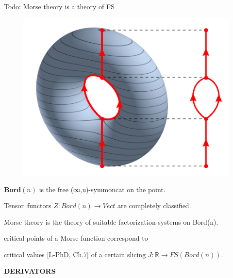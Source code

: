 \documentclass[handout]{beamer}
\begin{document}
\begin{frame}{Todo: Morse theory is a theory of FS}
  \begin{figure}
\includegraphics[scale=.15]{3D-Leveltorus-Reebgraph.png}
  \end{figure}

  $\textbf{Bord}(n)$ is the free (∞,\emph{n})-symmoncat on the point.

  \vspace{1cm}
  Tensor~functors $Z : Bord(n) \to Vect$ are completely classified.

  \vspace{1cm}
  Morse theory is the theory of suitable factorization systems on Bord(n).

  \alert{critical points of a Morse function}
  correspond to

 \alert{critical values} [\alert{L-PhD}, Ch.7] of a certain slicing $J : \mathbb R \to FS(Bord(n))$.
\end{frame}
%
%
%
%
%
%
%
\begin{frame}
  \Huge\centering \bfseries DERIVATORS
\end{frame}
%
\end{document}
